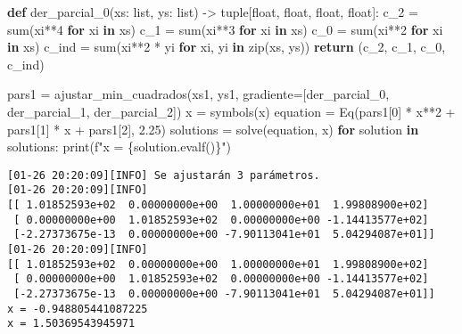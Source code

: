 \documentclass[
  letterpaper,
  DIV=11,
  numbers=noendperiod]{scrartcl}
\newenvironment{Shaded}{\begin{snugshade}}{\end{snugshade}}
\newcommand{\BuiltInTok}[1]{\textcolor[rgb]{0.00,0.23,0.31}{#1}}
\newcommand{\ControlFlowTok}[1]{\textcolor[rgb]{0.00,0.23,0.31}{\textbf{#1}}}
\newcommand{\DecValTok}[1]{\textcolor[rgb]{0.68,0.00,0.00}{#1}}
\newcommand{\FloatTok}[1]{\textcolor[rgb]{0.68,0.00,0.00}{#1}}
\newcommand{\KeywordTok}[1]{\textcolor[rgb]{0.00,0.23,0.31}{\textbf{#1}}}
\newcommand{\NormalTok}[1]{\textcolor[rgb]{0.00,0.23,0.31}{#1}}
\newcommand{\OperatorTok}[1]{\textcolor[rgb]{0.37,0.37,0.37}{#1}}
\newcommand{\SpecialCharTok}[1]{\textcolor[rgb]{0.37,0.37,0.37}{#1}}
\newcommand{\SpecialStringTok}[1]{\textcolor[rgb]{0.13,0.47,0.30}{#1}}
\newcommand{\StringTok}[1]{\textcolor[rgb]{0.13,0.47,0.30}{#1}}
\begin{document}
\begin{Shaded}
\begin{Highlighting}[]
\KeywordTok{def}\NormalTok{ der\_parcial\_0(xs: }\BuiltInTok{list}\NormalTok{, ys: }\BuiltInTok{list}\NormalTok{) }\OperatorTok{{-}\textgreater{}} \BuiltInTok{tuple}\NormalTok{[}\BuiltInTok{float}\NormalTok{, }\BuiltInTok{float}\NormalTok{, }\BuiltInTok{float}\NormalTok{, }\BuiltInTok{float}\NormalTok{]:}
\NormalTok{    c\_2 }\OperatorTok{=} \BuiltInTok{sum}\NormalTok{(xi}\OperatorTok{**}\DecValTok{4} \ControlFlowTok{for}\NormalTok{ xi }\KeywordTok{in}\NormalTok{ xs)}
\NormalTok{    c\_1 }\OperatorTok{=} \BuiltInTok{sum}\NormalTok{(xi}\OperatorTok{**}\DecValTok{3} \ControlFlowTok{for}\NormalTok{ xi }\KeywordTok{in}\NormalTok{ xs)}
\NormalTok{    c\_0 }\OperatorTok{=} \BuiltInTok{sum}\NormalTok{(xi}\OperatorTok{**}\DecValTok{2} \ControlFlowTok{for}\NormalTok{ xi }\KeywordTok{in}\NormalTok{ xs)}
\NormalTok{    c\_ind }\OperatorTok{=} \BuiltInTok{sum}\NormalTok{(xi}\OperatorTok{**}\DecValTok{2} \OperatorTok{*}\NormalTok{ yi }\ControlFlowTok{for}\NormalTok{ xi, yi }\KeywordTok{in} \BuiltInTok{zip}\NormalTok{(xs, ys))}
    \ControlFlowTok{return}\NormalTok{ (c\_2, c\_1, c\_0, c\_ind)}

\NormalTok{pars1 }\OperatorTok{=}\NormalTok{ ajustar\_min\_cuadrados(xs1, ys1, gradiente}\OperatorTok{=}\NormalTok{[der\_parcial\_0, der\_parcial\_1, der\_parcial\_2])}
\NormalTok{x }\OperatorTok{=}\NormalTok{ symbols(}\StringTok{\textquotesingle{}x\textquotesingle{}}\NormalTok{)}
\NormalTok{equation }\OperatorTok{=}\NormalTok{ Eq(pars1[}\DecValTok{0}\NormalTok{] }\OperatorTok{*}\NormalTok{ x}\OperatorTok{**}\DecValTok{2} \OperatorTok{+}\NormalTok{ pars1[}\DecValTok{1}\NormalTok{] }\OperatorTok{*}\NormalTok{ x }\OperatorTok{+}\NormalTok{ pars1[}\DecValTok{2}\NormalTok{], }\FloatTok{2.25}\NormalTok{)}
\NormalTok{solutions }\OperatorTok{=}\NormalTok{ solve(equation, x)}
\ControlFlowTok{for}\NormalTok{ solution }\KeywordTok{in}\NormalTok{ solutions:}
    \BuiltInTok{print}\NormalTok{(}\SpecialStringTok{f"x = }\SpecialCharTok{\{}\NormalTok{solution}\SpecialCharTok{.}\NormalTok{evalf()}\SpecialCharTok{\}}\SpecialStringTok{"}\NormalTok{)}
\end{Highlighting}
\end{Shaded}

\begin{verbatim}
[01-26 20:20:09][INFO] Se ajustarán 3 parámetros.
[01-26 20:20:09][INFO] 
[[ 1.01852593e+02  0.00000000e+00  1.00000000e+01  1.99808900e+02]
 [ 0.00000000e+00  1.01852593e+02  0.00000000e+00 -1.14413577e+02]
 [-2.27373675e-13  0.00000000e+00 -7.90113041e+01  5.04294087e+01]]
[01-26 20:20:09][INFO] 
[[ 1.01852593e+02  0.00000000e+00  1.00000000e+01  1.99808900e+02]
 [ 0.00000000e+00  1.01852593e+02  0.00000000e+00 -1.14413577e+02]
 [-2.27373675e-13  0.00000000e+00 -7.90113041e+01  5.04294087e+01]]
x = -0.948805441087225
x = 1.50369543945971
\end{verbatim}
\end{document}
